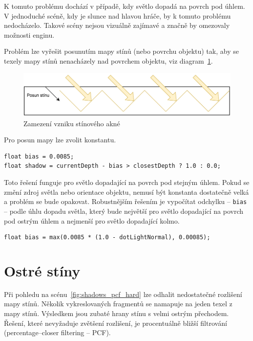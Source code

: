\documentclass[thesis=M,czech]{FITthesis}[2019/12/23]
\begin{document}
K tomuto problému dochází v případě, kdy světlo dopadá na povrch pod úhlem. V jednoduché scéně, kdy je slunce nad hlavou hráče, by k tomuto problému nedocházelo. Takové scény nejsou vizuálně zajímavé a značně by omezovaly možnosti enginu.

Problém lze vyřešit posunutím mapy stínů (nebo povrchu objektu) tak, aby se texely mapy stínů nenacházely nad povrchem objektu, viz diagram~\ref{fig:shadows_diag_acne_fix}.

\begin{figure}\centering
	\includegraphics[width=\textwidth]{images/shadows/diag_acne_fix}
	\caption[Zamezení vzniku stínového akné]{Zamezení vzniku stínového akné}\label{fig:shadows_diag_acne_fix}
\end{figure}

Pro posun mapy lze zvolit konstantu.

\begin{verbatim}
float bias = 0.0085;
float shadow = currentDepth - bias > closestDepth ? 1.0 : 0.0;
\end{verbatim}

Toto řešení funguje pro světlo dopadající na povrch pod stejným úhlem. Pokud se změní zdroj světla nebo orientace objektu, nemusí být konstanta dostatečně velká a problém se bude opakovat. Robustnějším řešením je vypočítat odchylku -- \texttt{bias} -- podle úhlu dopadu světla, který bude největší pro světlo dopadající na povrch pod ostrým úhlem a nejmenší pro světlo dopadající kolmo.

\begin{verbatim}
float bias = max(0.0085 * (1.0 - dotLightNormal), 0.00085);
\end{verbatim}

\section{Ostré stíny}

Při pohledu na scénu~\ref{fig:shadows_pcf_hard} lze odhalit nedostatečné rozlišení mapy stínů. Několik vykreslovaných fragmentů se namapuje na jeden texel z mapy stínů. Vý\-sled\-kem jsou zubaté hrany stínu s velmi ostrým přechodem. Řešení, které nevyžaduje zvětšení rozlišení, je procentuálně bližší filtrování (percentage--closer filtering -- PCF).
\end{document}
